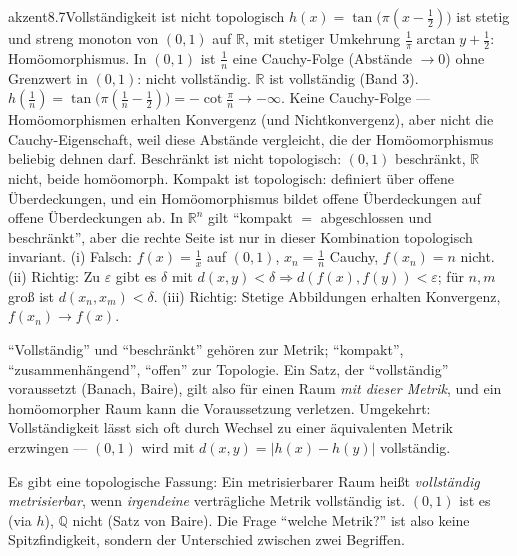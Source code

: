 \begin{loesungkarte}{akzent}{8.7}{Vollständigkeit ist nicht topologisch}
$h(x) = \tan\bigl(\pi(x - \frac12)\bigr)$ ist stetig und streng monoton von $(0, 1)$ auf $\mathbb R$, mit stetiger Umkehrung $\frac1\pi\arctan y + \frac12$: Homöomorphismus. In $(0, 1)$ ist $\frac1n$ eine Cauchy-Folge (Abstände $\to0$) ohne Grenzwert in $(0, 1)$: nicht vollständig. $\mathbb R$ ist vollständig (Band 3).
$h(\frac1n) = \tan\bigl(\pi(\frac1n - \frac12)\bigr) = -\cot\frac\pi n\to-\infty$. Keine Cauchy-Folge --- Homöomorphismen erhalten Konvergenz (und Nichtkonvergenz), aber nicht die Cauchy-Eigenschaft, weil diese Abstände vergleicht, die der Homöomorphismus beliebig dehnen darf.
Beschränkt ist nicht topologisch: $(0, 1)$ beschränkt, $\mathbb R$ nicht, beide homöomorph. Kompakt ist topologisch: definiert über offene Überdeckungen, und ein Homöomorphismus bildet offene Überdeckungen auf offene Überdeckungen ab. In $\mathbb R^{n}$ gilt \enquote{kompakt $=$ abgeschlossen und beschränkt}, aber die rechte Seite ist nur in dieser Kombination topologisch invariant.
(i) Falsch: $f(x) = \frac1x$ auf $(0, 1)$, $x_n = \frac1n$ Cauchy, $f(x_n) = n$ nicht. (ii) Richtig: Zu $\varepsilon$ gibt es $\delta$ mit $d(x, y) < \delta\Rightarrow d(f(x), f(y)) < \varepsilon$; für $n, m$ groß ist $d(x_n, x_m) < \delta$. (iii) Richtig: Stetige Abbildungen erhalten Konvergenz, $f(x_n)\to f(x)$.
\begin{fehler}\kastentext
\enquote{Vollständig} und \enquote{beschränkt} gehören zur Metrik; \enquote{kompakt}, \enquote{zusammenhängend}, \enquote{offen} zur Topologie. Ein Satz, der \enquote{vollständig} voraussetzt (Banach, Baire), gilt also für einen Raum \emph{mit dieser Metrik}, und ein homöomorpher Raum kann die Voraussetzung verletzen. Umgekehrt: Vollständigkeit lässt sich oft durch Wechsel zu einer äquivalenten Metrik erzwingen --- $(0, 1)$ wird mit $d(x, y) = |h(x) - h(y)|$ vollständig.
\end{fehler}
\begin{mitnehmen}\kastentext
Es gibt eine topologische Fassung: Ein metrisierbarer Raum heißt \emph{vollständig metrisierbar}, wenn \emph{irgendeine} verträgliche Metrik vollständig ist. $(0, 1)$ ist es (via $h$), $\mathbb Q$ nicht (Satz von Baire). Die Frage \enquote{welche Metrik?} ist also keine Spitzfindigkeit, sondern der Unterschied zwischen zwei Begriffen.
\end{mitnehmen}
\end{loesungkarte}

